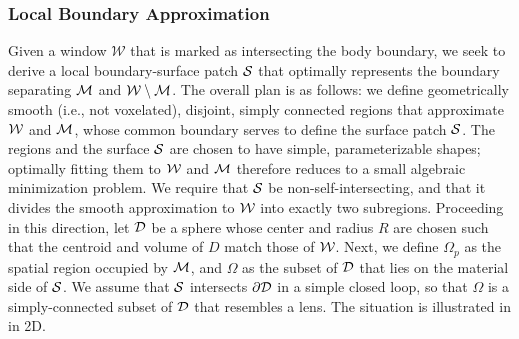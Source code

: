 \subsubsection{Local Boundary Approximation}

Given a window $\mathcal{W}$ that is marked as intersecting the body boundary, we seek to derive a local boundary-surface patch $\mathcal{S}$ that optimally represents the boundary separating $\mathcal{M}$ and $\mathcal{W} \setminus \mathcal{M}$.  The overall plan is as follows: we define geometrically smooth (i.e., not voxelated), disjoint, simply connected regions that approximate $\mathcal{W}$ and $\mathcal{M}$, whose common boundary serves to define the surface patch $\mathcal{S}$.  The regions and the surface $\mathcal{S}$ are chosen to have simple, parameterizable shapes; optimally fitting them to $\mathcal{W}$ and $\mathcal{M}$ therefore reduces to a small algebraic minimization problem.  We require that $\mathcal{S}$ be non-self-intersecting, and that it divides the smooth approximation to $\mathcal{W}$ into exactly two subregions. 
Proceeding in this direction, let $\mathcal{D}$ be a sphere whose center and radius $R$ are chosen such that the centroid and volume of $D$ match those of $\mathcal{W}$.  Next, we define $\Omega_p$ as the spatial region occupied by $\mathcal{M}$, and $\Omega$ as the subset of $\mathcal{D}$ that lies on the material side of $\mathcal{S}$.  We assume that $\mathcal{S}$ intersects $\partial \mathcal{D}$ in a simple closed loop, so that $\Omega$ is a simply-connected subset of $\mathcal{D}$ that resembles a lens. The situation is illustrated in  in 2D.
